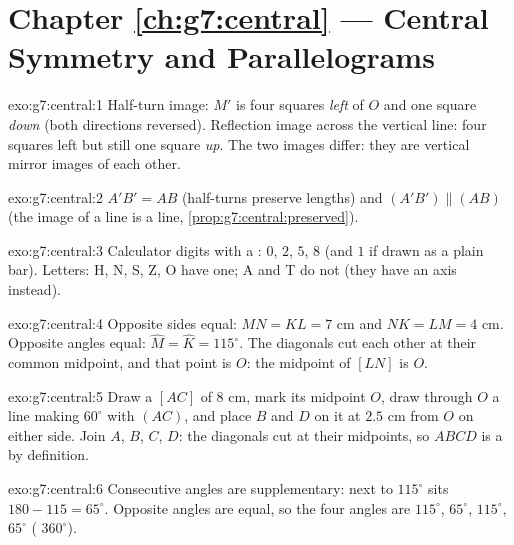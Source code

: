 \section*{Chapter \ref{ch:g7:central} --- Central Symmetry and Parallelograms}

\begin{solution}{exo:g7:central:1}
Half-turn image: $M'$ is four squares \emph{left} of $O$ and one
square \emph{down} (both directions reversed). Reflection image
across the vertical line: four squares left but still one square
\emph{up}. The two images differ: they are vertical mirror images of
each other.
\end{solution}

\begin{solution}{exo:g7:central:2}
$A'B' = AB$ (half-turns preserve lengths) and
$(A'B') \parallel (AB)$ (the image of a line is a  line,
\cref{prop:g7:central:preserved}).
\end{solution}

\begin{solution}{exo:g7:central:3}
Calculator digits with a : $0$, $2$, $5$, $8$ (and
$1$ if drawn as a plain bar). Letters: H, N, S, Z, O have one; A and
T do not (they have an axis instead).
\end{solution}

\begin{solution}{exo:g7:central:4}
Opposite sides equal: $MN = KL = 7$ cm and $NK = LM = 4$ cm. Opposite
angles equal: $\widehat M = \widehat K = 115^\circ$. The diagonals
cut each other at their common midpoint, and that point is $O$: the
midpoint of $[LN]$ is $O$.
\end{solution}

\begin{solution}{exo:g7:central:5}
Draw a  $[AC]$ of $8$ cm, mark its midpoint $O$, draw through
$O$ a line making $60^\circ$ with $(AC)$, and place $B$ and $D$ on it
at $2.5$ cm from $O$ on either side. Join $A$, $B$, $C$, $D$: the
diagonals cut at their midpoints, so $ABCD$ is a  by
definition.
\end{solution}

\begin{solution}{exo:g7:central:6}
Consecutive angles are supplementary: next to $115^\circ$ sits
$180 - 115 = 65^\circ$. Opposite angles are equal, so the four angles
are $115^\circ$, $65^\circ$, $115^\circ$, $65^\circ$ (
$360^\circ$).
\end{solution}

